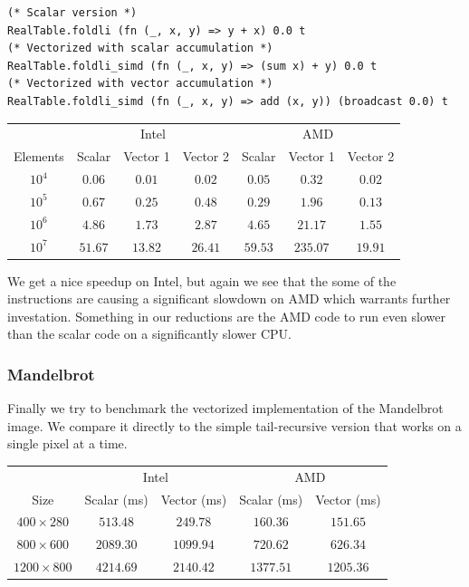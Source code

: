 \documentclass{article}
\begin{document}
\begin{verbatim}
(* Scalar version *)
RealTable.foldli (fn (_, x, y) => y + x) 0.0 t
(* Vectorized with scalar accumulation *)
RealTable.foldli_simd (fn (_, x, y) => (sum x) + y) 0.0 t
(* Vectorized with vector accumulation *)
RealTable.foldli_simd (fn (_, x, y) => add (x, y)) (broadcast 0.0) t
\end{verbatim}
\begin{center}
\begin{tabular}{c c c c c c c}
    \toprule
    & \multicolumn{3}{c}{Intel} & \multicolumn{3}{c}{AMD} \\
    Elements & Scalar & Vector 1 & Vector 2 & Scalar & Vector 1 & Vector 2 \\
    \midrule
    $10^4$ & $0.06$ & $0.01$ & $0.02$ & $0.05$ & $0.32$ & $0.02$ \\
    $10^5$ & $0.67$ & $0.25$ & $0.48$ & $0.29$ & $1.96$ & $0.13$ \\
    $10^6$ & $4.86$ & $1.73$ & $2.87$ & $4.65$ & $21.17$ & $1.55$ \\
    $10^7$ & $51.67$ & $13.82$ & $26.41$ & $59.53$ & $235.07$ & $19.91$ \\
    \bottomrule
\end{tabular}
\end{center}
We get a nice speedup on Intel, but again we see that the some of the instructions are causing a significant slowdown on AMD which warrants further investation. Something in our reductions are the AMD code to run even slower than the scalar code on a significantly slower CPU.

\subsubsection{Mandelbrot}

Finally we try to benchmark the vectorized implementation of the Mandelbrot image. We compare it directly to the simple tail-recursive version that works on a single pixel at a time.

\begin{center}
\begin{tabular}{c c c c c}
    \toprule
    & \multicolumn{2}{c}{Intel} & \multicolumn{2}{c}{AMD} \\
    Size & Scalar (ms) & Vector (ms) & Scalar (ms) & Vector (ms) \\
    \midrule
    $400 \times 280$ & $513.48$ & $249.78$ & $160.36$ & $151.65$ \\
    $800 \times 600$ & $2089.30$ & $1099.94$ & $720.62$ & $626.34$ \\
    $1200 \times 800$ & $4214.69$ & $2140.42$ & $1377.51$ & $1205.36$ \\
    \bottomrule
\end{tabular}
\end{center}
\end{document}
